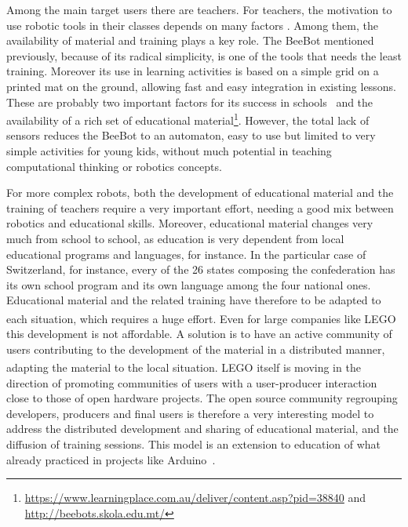 \documentclass[letterpaper, 10 pt, conference]{ieeeconf}  %
\begin{document}
Among the main target users there are teachers.
For teachers, the motivation to use robotic tools in their classes depends on many factors \cite{chevalier2016}.
Among them, the availability of material and training plays a key role.
The BeeBot mentioned previously, because of its radical simplicity, is one of the tools that needs the least training. 
Moreover its use in learning activities is based on a simple grid on a printed mat on the ground, allowing fast and easy integration in existing lessons.
These are probably two important factors for its success in schools~\cite{2008highfield,2008demichele} and the availability of a rich set of educational material\footnote{\url{https://www.learningplace.com.au/deliver/content.asp?pid=38840} and \\ \url{http://beebots.skola.edu.mt/}}.
However, the total lack of sensors reduces the BeeBot to an automaton, easy to use but limited to very simple activities for young kids, without much potential in teaching computational thinking or robotics concepts.

For more complex robots, both the development of educational material and the training of teachers require a very important effort, needing a good mix between robotics and educational skills. 
Moreover, educational material changes very much from school to school, as education is very dependent from local educational programs and languages, for instance. 
In the particular case of Switzerland, for instance, every of the 26 states composing the confederation has its own school program and its own language among the four national ones. 
Educational material and the related training have therefore to be adapted to each situation, which requires a huge effort.
Even for large companies like LEGO\textsuperscript{\textregistered} this development is not affordable. 
A solution is to have an active community of users contributing to the development of the material in a distributed manner, adapting the material to the local situation.
LEGO\textsuperscript{\textregistered} itself is moving in the direction of promoting communities of users \cite{Hienerth2014} with a user-producer interaction close to those of open hardware projects.
The open source community regrouping developers, producers and final users is therefore a very interesting model to address the distributed development and sharing of educational material, and the diffusion of training sessions.
This model is an extension to education of what already practiced in projects like Arduino~\cite{Jamieson2010}.
\end{document}
